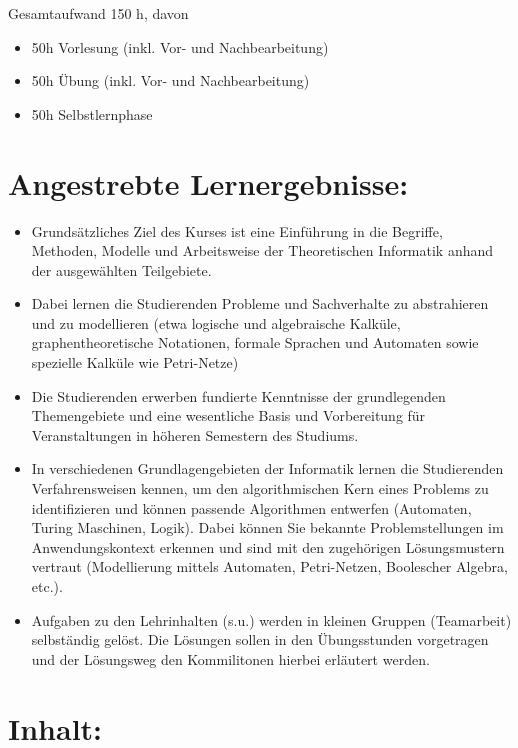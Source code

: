 Gesamtaufwand 150 h, davon

\begin{itemize}
\item
  50h Vorlesung (inkl. Vor- und Nachbearbeitung)
\item
  50h Übung (inkl. Vor- und Nachbearbeitung)
\item
  50h Selbstlernphase
\end{itemize}

\section*{Angestrebte
Lernergebnisse:}\label{angestrebte-lernergebnisse-27}

\begin{itemize}
\item
  Grundsätzliches Ziel des Kurses ist eine Einführung in die Begriffe,
  Methoden, Modelle und Arbeitsweise der Theoretischen Informatik anhand
  der ausgewählten Teilgebiete.
\item
  Dabei lernen die Studierenden Probleme und Sachverhalte zu
  abstrahieren und zu modellieren (etwa logische und algebraische
  Kalküle, graphentheoretische Notationen, formale Sprachen und
  Automaten sowie spezielle Kalküle wie Petri-Netze)
\item
  Die Studierenden erwerben fundierte Kenntnisse der grundlegenden
  Themengebiete und eine wesentliche Basis und Vorbereitung für
  Veranstaltungen in höheren Semestern des Studiums.
\item
  In verschiedenen Grundlagengebieten der Informatik lernen die
  Studierenden Verfahrensweisen kennen, um den algorithmischen Kern
  eines Problems zu identifizieren und können passende Algorithmen
  entwerfen (Automaten, Turing Maschinen, Logik). Dabei können Sie
  bekannte Problemstellungen im Anwendungskontext erkennen und sind mit
  den zugehörigen Lösungsmustern vertraut (Modellierung mittels
  Automaten, Petri-Netzen, Boolescher Algebra, etc.).
\item
  Aufgaben zu den Lehrinhalten (s.u.) werden in kleinen Gruppen
  (Teamarbeit) selbständig gelöst. Die Lösungen sollen in den
  Übungsstunden vorgetragen und der Lösungsweg den Kommilitonen hierbei
  erläutert werden.
\end{itemize}

\section*{Inhalt:}\label{inhalt-27}

